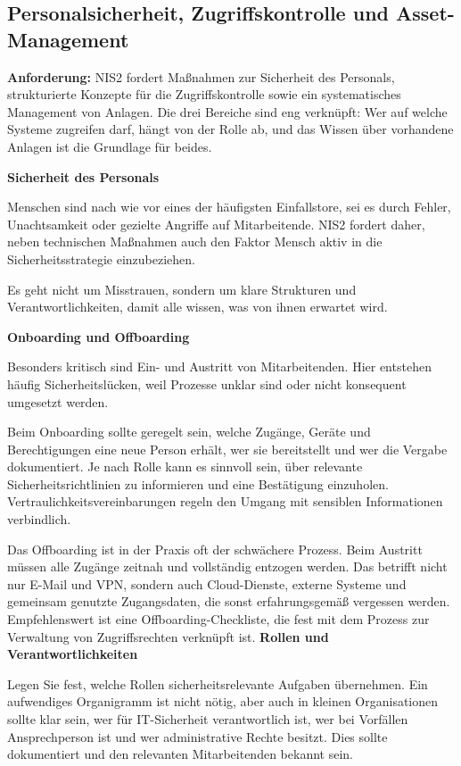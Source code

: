 \newpage
\subsection{Personalsicherheit, Zugriffskontrolle und Asset-Management}

\textbf{Anforderung:} NIS2 fordert Maßnahmen zur Sicherheit des Personals, strukturierte Konzepte für die Zugriffskontrolle sowie ein systematisches Management von Anlagen. Die drei Bereiche sind eng verknüpft: Wer auf welche Systeme zugreifen darf, hängt von der Rolle ab, und das Wissen über vorhandene Anlagen ist die Grundlage für beides.

\textbf{Sicherheit des Personals}

Menschen sind nach wie vor eines der häufigsten Einfallstore, sei es durch Fehler, Unachtsamkeit oder gezielte Angriffe auf Mitarbeitende. NIS2 fordert daher, neben technischen Maßnahmen auch den Faktor Mensch aktiv in die Sicherheitsstrategie einzubeziehen.

Es geht nicht um Misstrauen, sondern um klare Strukturen und Verantwortlichkeiten, damit alle wissen, was von ihnen erwartet wird.

\textbf{Onboarding und Offboarding}

Besonders kritisch sind Ein- und Austritt von Mitarbeitenden. Hier entstehen häufig Sicherheitslücken, weil Prozesse unklar sind oder nicht konsequent umgesetzt werden.

Beim Onboarding sollte geregelt sein, welche Zugänge, Geräte und Berechtigungen eine neue Person erhält, wer sie bereitstellt und wer die Vergabe dokumentiert. Je nach Rolle kann es sinnvoll sein, über relevante Sicherheitsrichtlinien zu informieren und eine Bestätigung einzuholen. Vertraulichkeitsvereinbarungen regeln den Umgang mit sensiblen Informationen verbindlich.

Das Offboarding ist in der Praxis oft der schwächere Prozess. Beim Austritt müssen alle Zugänge zeitnah und vollständig entzogen werden. Das betrifft nicht nur E-Mail und VPN, sondern auch Cloud-Dienste, externe Systeme und gemeinsam genutzte Zugangsdaten, die sonst erfahrungsgemäß vergessen werden. Empfehlenswert ist eine Offboarding-Checkliste, die fest mit dem Prozess zur Verwaltung von Zugriffsrechten verknüpft ist.
\newpage
\textbf{Rollen und Verantwortlichkeiten}

Legen Sie fest, welche Rollen sicherheitsrelevante Aufgaben übernehmen. Ein aufwendiges Organigramm ist nicht nötig, aber auch in kleinen Organisationen sollte klar sein, wer für IT-Sicherheit verantwortlich ist, wer bei Vorfällen Ansprechperson ist und wer administrative Rechte besitzt. Dies sollte dokumentiert und den relevanten Mitarbeitenden bekannt sein.

